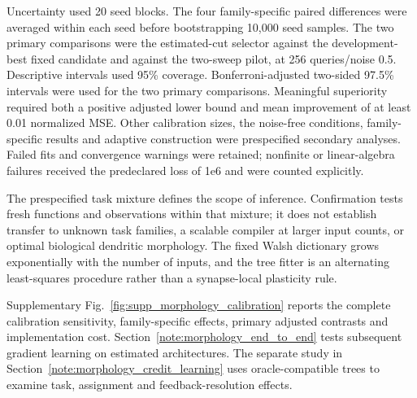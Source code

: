 Uncertainty used 20 seed blocks. The four family-specific paired differences were averaged within each seed before bootstrapping 10,000 seed samples. The two primary comparisons were the estimated-cut selector against the development-best fixed candidate and against the two-sweep pilot, at 256 queries/noise 0.5. Descriptive intervals used 95\% coverage. Bonferroni-adjusted two-sided 97.5\% intervals were used for the two primary comparisons. Meaningful superiority required both a positive adjusted lower bound and mean improvement of at least 0.01 normalized MSE. Other calibration sizes, the noise-free conditions, family-specific results and adaptive construction were prespecified secondary analyses. Failed fits and convergence warnings were retained; nonfinite or linear-algebra failures received the predeclared loss of 1e6 and were counted explicitly.

The prespecified task mixture defines the scope of inference. Confirmation tests fresh functions and observations within that mixture; it does not establish transfer to unknown task families, a scalable compiler at larger input counts, or optimal biological dendritic morphology. The fixed Walsh dictionary grows exponentially with the number of inputs, and the tree fitter is an alternating least-squares procedure rather than a synapse-local plasticity rule.

Supplementary Fig.~\ref{fig:supp_morphology_calibration} reports the complete
calibration sensitivity, family-specific effects, primary adjusted contrasts
and implementation cost. Section~\ref{note:morphology_end_to_end} tests
subsequent gradient learning on estimated architectures. The separate study
in Section~\ref{note:morphology_credit_learning} uses oracle-compatible trees
to examine task, assignment and feedback-resolution effects.
